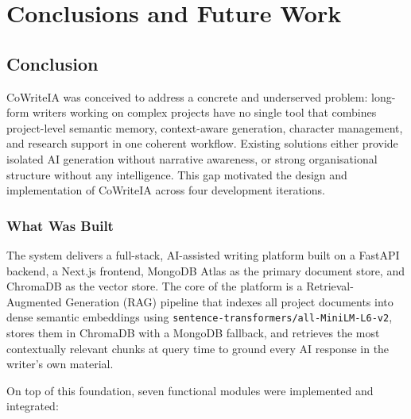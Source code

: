 \chapter{Conclusions and Future Work}
\label{ch:conclusions}

\section{Conclusion}
\label{sec:conclusion}

CoWriteIA was conceived to address a concrete and underserved problem: long-form writers working on complex projects have no single tool that combines project-level semantic memory, context-aware generation, character management, and research support in one coherent workflow. Existing solutions either provide isolated AI generation without narrative awareness, or strong organisational structure without any intelligence. This gap motivated the design and implementation of CoWriteIA across four development iterations.

\subsection{What Was Built}

The system delivers a full-stack, AI-assisted writing platform built on a FastAPI backend, a Next.js frontend, MongoDB Atlas as the primary document store, and ChromaDB as the vector store. The core of the platform is a Retrieval-Augmented Generation (RAG) pipeline that indexes all project documents into dense semantic embeddings using \texttt{sentence-transformers/all-MiniLM-L6-v2}, stores them in ChromaDB with a MongoDB fallback, and retrieves the most contextually relevant chunks at query time to ground every AI response in the writer's own material.

On top of this foundation, seven functional modules were implemented and integrated:

